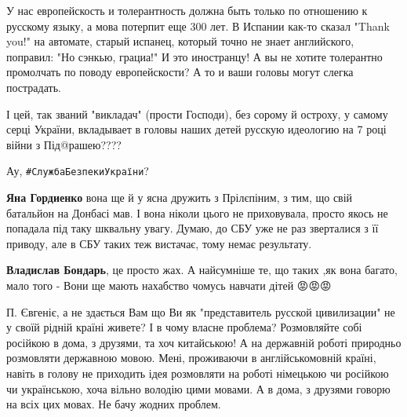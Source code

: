 \begin{itemize}
\begin{itemize}
У нас европейскость и толерантность должна быть только по отношению к русскому
языку, а мова потерпит еще 300 лет. В Испании как-то сказал "Thank you!" на
автомате, старый испанец, который точно не знает английского, поправил: "Но
сэнкью, грациа!" И это иностранцу! А вы не хотите толерантно промолчать по
поводу европейскости? А то и ваши головы могут слегка пострадать.
\end{itemize}

 

І цей, так званий "викладач" (прости Господи), без сорому й остроху, у самому
серці України, вкладывает в головы наших детей русскую идеологию на 7 році
війни з Під@рашею????

Ау,
\verb|#СлужбаБезпекиУкраїни|?

\begin{itemize}
 
\textbf{Яна Гордиенко} вона ще й у ясна дружить з Прілєпіним, з тим, що свій батальйон на Донбасі мав. І вона ніколи цього не приховувала, просто якось не попадала під таку шквальну увагу. Думаю, до СБУ уже не раз зверталися з її приводу, але в СБУ таких теж вистачає, тому немає результату.

 
\textbf{Владислав Бондарь}, це просто жах.
А найсумніше те, що таких ,як вона багато, мало того - Вони ще мають нахабство чомусь навчати дітей 😡😡😡
\end{itemize}

 

П. Євгеніє, а не здається Вам що Ви як "представитель русской цивилизации" не у
своїй рідній країні живете? І в чому власне проблема? Розмовляйте собі російкою
в дома, з друзями, та хоч китайською! А на державній роботі природньо
розмовляти державною мовою. Мені, проживаючи в англійськомовній країні, навіть
в голову не приходить ідея розмовляти на роботі німецькою чи російкою чи
українською, хоча вільно володію цими мовами. А в дома, з друзями говорю на
всіх цих мовах. Не бачу жодних проблем.



\end{itemize}
